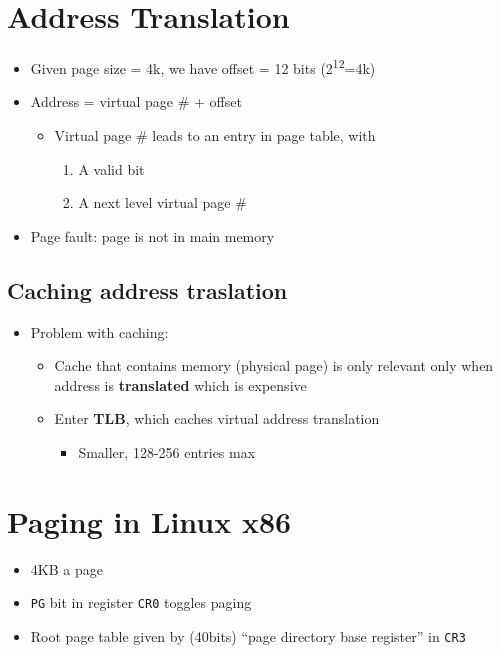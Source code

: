 \documentclass[11pt]{article}
\begin{document}
\section{Address Translation}
\label{sec:org0b479d6}
\begin{itemize}
\item Given page size = 4k, we have offset = 12 bits (2\textsuperscript{12}=4k)
\item Address = virtual page \# + offset
\begin{itemize}
\item Virtual page \# leads to an entry in page table, with
\begin{enumerate}
\item A valid bit
\item A next level virtual page \#
\end{enumerate}
\end{itemize}
\item Page fault: page is not in main memory
\end{itemize}
\subsection{Caching address traslation}
\label{sec:org8aebf55}
\begin{itemize}
\item Problem with caching:
\begin{itemize}
\item Cache that contains memory (physical page) is only relevant only when
address is \textbf{translated} which is expensive
\item Enter \textbf{TLB}, which caches virtual address translation
\begin{itemize}
\item Smaller, 128-256 entries max
\end{itemize}
\end{itemize}
\end{itemize}
\section{Paging in Linux x86}
\label{sec:orgac2ba53}
\begin{itemize}
\item 4KB a page
\item \texttt{PG} bit in register \texttt{CR0} toggles paging
\item Root page table given by (40bits) ``page directory base register'' in \texttt{CR3}
\end{itemize}
\end{document}
